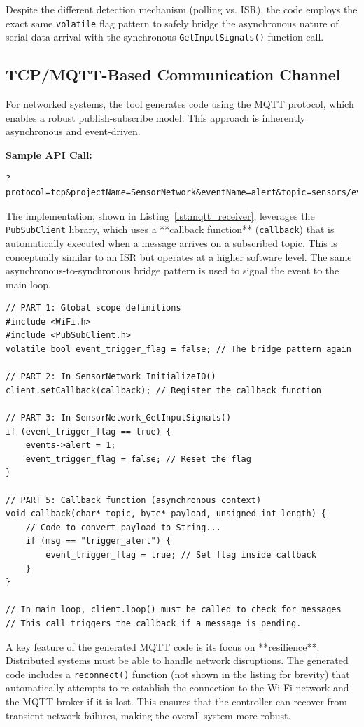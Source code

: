 Despite the different detection mechanism (polling vs. ISR), the code employs the exact same \texttt{volatile} flag pattern to safely bridge the asynchronous nature of serial data arrival with the synchronous \texttt{GetInputSignals()} function call.

\subsection{TCP/MQTT-Based Communication Channel}
For networked systems, the tool generates code using the MQTT protocol, which enables a robust publish-subscribe model. This approach is inherently asynchronous and event-driven.

\noindent\textbf{Sample API Call:}
\begin{verbatim}
?protocol=tcp&projectName=SensorNetwork&eventName=alert&topic=sensors/events
\end{verbatim}

The implementation, shown in Listing~\ref{lst:mqtt_receiver}, leverages the \texttt{PubSubClient} library, which uses a **callback function** (\texttt{callback}) that is automatically executed when a message arrives on a subscribed topic. This is conceptually similar to an ISR but operates at a higher software level. The same asynchronous-to-synchronous bridge pattern is used to signal the event to the main loop.

\begin{verbatim}
// PART 1: Global scope definitions
#include <WiFi.h>
#include <PubSubClient.h>
volatile bool event_trigger_flag = false; // The bridge pattern again

// PART 2: In SensorNetwork_InitializeIO()
client.setCallback(callback); // Register the callback function

// PART 3: In SensorNetwork_GetInputSignals()
if (event_trigger_flag == true) {
    events->alert = 1;
    event_trigger_flag = false; // Reset the flag
}

// PART 5: Callback function (asynchronous context)
void callback(char* topic, byte* payload, unsigned int length) {
    // Code to convert payload to String...
    if (msg == "trigger_alert") {
        event_trigger_flag = true; // Set flag inside callback
    }
}

// In main loop, client.loop() must be called to check for messages
// This call triggers the callback if a message is pending.
\end{verbatim}

A key feature of the generated MQTT code is its focus on **resilience**. Distributed systems must be able to handle network disruptions. The generated code includes a \texttt{reconnect()} function (not shown in the listing for brevity) that automatically attempts to re-establish the connection to the Wi-Fi network and the MQTT broker if it is lost. This ensures that the controller can recover from transient network failures, making the overall system more robust.

